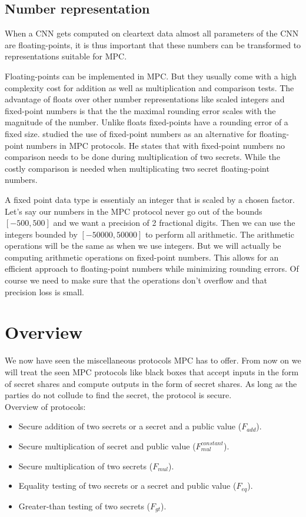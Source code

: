 \subsection{Number representation}
When a CNN gets computed on cleartext data almost all parameters of the CNN are floating-points, it is thus important that these numbers can be transformed to representations suitable for MPC.

Floating-points can be implemented in MPC. But they usually come with a high complexity cost for addition as well as multiplication and comparison tests. The advantage of floats over other number representations like scaled integers and fixed-point numbers is that the the maximal rounding error scales with the magnitude of the number. Unlike floats fixed-points have a rounding error of a fixed size. \cite{campmans2018optimizing} studied the use of fixed-point numbers as an alternative for floating-point numbers in MPC protocols. He states that with fixed-point numbers no comparison needs to be done during multiplication of two secrets. While the costly comparison is needed when multiplicating two secret floating-point numbers.

A fixed point data type is essentialy an integer that is scaled by a chosen factor. Let's say our numbers in the MPC protocol never go out of the bounds $[-500,500]$ and we want a precision of 2 fractional digits. Then we can use the integers bounded by $[-50000,50000]$ to perform all arithmetic. The arithmetic operations will be the same as when we use integers. But we will actually be computing arithmetic operations on fixed-point numbers. This allows for an efficient approach to floating-point numbers while minimizing rounding errors. Of course we need to make sure that the operations don't overflow and that precision loss is small.

\section{Overview}
We now have seen the miscellaneous protocols MPC has to offer. From now on we will treat the seen MPC protocols like black boxes that accept inputs in the form of secret shares and compute outputs in the form of secret shares. As long as the parties do not collude to find the secret, the protocol is secure.\\
Overview of protocols:
\begin{itemize}
  \item Secure addition of two secrets or a secret and a public value ($F_{add}$).
  \item Secure multiplication of secret and public value ($F_{mul}^{constant}$).
  \item Secure multiplication of two secrets ($F_{mul}$).
  \item Equality testing of two secrets or a secret and public value ($F_{eq}$).
  \item Greater-than testing of two secrets ($F_{gt}$).
\end{itemize}

